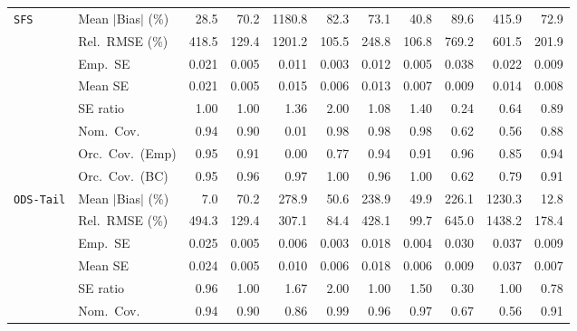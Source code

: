 \begin{landscape}
\begin{longtable}{llrrrrrrrrr}
\addlinespace[2pt]
\quad \texttt{SFS} & Mean $|$Bias$|$ (\%) & \cellcolor{rankone}28.5 & \cellcolor{rankthree}70.2 & 1180.8 & 82.3 & 73.1 & \cellcolor{ranktwo}40.8 & 89.6 & 415.9 & 72.9 \\
 & Rel.\ RMSE (\%) & 418.5 & \cellcolor{rankthree}129.4 & 1201.2 & \cellcolor{rankone}105.5 & 248.8 & \cellcolor{ranktwo}106.8 & 769.2 & 601.5 & 201.9 \\
 & Emp.\ SE & 0.021 & 0.005 & 0.011 & 0.003 & 0.012 & 0.005 & 0.038 & 0.022 & 0.009 \\
 & Mean SE & 0.021 & 0.005 & 0.015 & 0.006 & 0.013 & 0.007 & 0.009 & 0.014 & 0.008 \\
 & SE ratio & \cellcolor{rankone}1.00 & \cellcolor{rankone}1.00 & 1.36 & 2.00 & \cellcolor{ranktwo}1.08 & 1.40 & 0.24 & 0.64 & \cellcolor{rankthree}0.89 \\
 & Nom.\ Cov. & \cellcolor{rankone}0.94 & \cellcolor{rankthree}0.90 & 0.01 & \cellcolor{ranktwo}0.98 & \cellcolor{ranktwo}0.98 & \cellcolor{ranktwo}0.98 & 0.62 & 0.56 & 0.88 \\
 & Orc.\ Cov.\ (Emp) & \cellcolor{rankone}0.95 & \cellcolor{rankthree}0.91 & 0.00 & 0.77 & \cellcolor{ranktwo}0.94 & \cellcolor{rankthree}0.91 & \cellcolor{ranktwo}0.96 & 0.85 & \cellcolor{ranktwo}0.94 \\
 & Orc.\ Cov.\ (BC) & \cellcolor{rankone}0.95 & \cellcolor{ranktwo}0.96 & \cellcolor{rankthree}0.97 & 1.00 & \cellcolor{ranktwo}0.96 & 1.00 & 0.62 & 0.79 & 0.91 \\
\addlinespace[2pt]
\quad \texttt{ODS-Tail} & Mean $|$Bias$|$ (\%) & \cellcolor{rankone}7.0 & 70.2 & 278.9 & 50.6 & 238.9 & \cellcolor{rankthree}49.9 & 226.1 & 1230.3 & \cellcolor{ranktwo}12.8 \\
 & Rel.\ RMSE (\%) & 494.3 & \cellcolor{rankthree}129.4 & 307.1 & \cellcolor{rankone}84.4 & 428.1 & \cellcolor{ranktwo}99.7 & 645.0 & 1438.2 & 178.4 \\
 & Emp.\ SE & 0.025 & 0.005 & 0.006 & 0.003 & 0.018 & 0.004 & 0.030 & 0.037 & 0.009 \\
 & Mean SE & 0.024 & 0.005 & 0.010 & 0.006 & 0.018 & 0.006 & 0.009 & 0.037 & 0.007 \\
 & SE ratio & \cellcolor{ranktwo}0.96 & \cellcolor{rankone}1.00 & 1.67 & 2.00 & \cellcolor{rankone}1.00 & 1.50 & 0.30 & \cellcolor{rankone}1.00 & \cellcolor{rankthree}0.78 \\
 & Nom.\ Cov. & \cellcolor{rankone}0.94 & 0.90 & 0.86 & \cellcolor{rankthree}0.99 & \cellcolor{rankone}0.96 & \cellcolor{ranktwo}0.97 & 0.67 & 0.56 & \cellcolor{rankthree}0.91 \\

\end{longtable}
\end{landscape}
